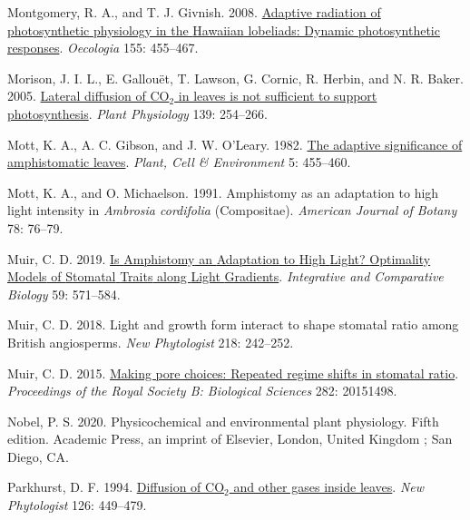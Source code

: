 \documentclass[
  letterpaper,
  DIV=11,
  numbers=noendperiod]{scrartcl}
\newlength{\cslhangindent}
\newlength{\cslentryspacingunit} %
\newenvironment{CSLReferences}[2] %
 {%
  \setlength{\parindent}{0pt}
  \ifodd #1
  \let\oldpar\par
  \def\par{\hangindent=\cslhangindent\oldpar}
  \fi
  \setlength{\parskip}{#2\cslentryspacingunit}
 }%
 {}
\begin{document}
\begin{CSLReferences}{1}{0}
\leavevmode{}%
Montgomery, R. A., and T. J. Givnish. 2008.
\href{https://doi.org/10.1007/s00442-007-0936-3}{Adaptive radiation of
photosynthetic physiology in the {Hawaiian} lobeliads: Dynamic
photosynthetic responses}. \emph{Oecologia} 155: 455--467.

\leavevmode{}%
Morison, J. I. L., E. Gallouët, T. Lawson, G. Cornic, R. Herbin, and N.
R. Baker. 2005. \href{https://doi.org/10.1104/pp.105.062950}{Lateral
diffusion of {CO}\(_{\textrm{2}}\) in leaves is not sufficient to
support photosynthesis}. \emph{Plant Physiology} 139: 254--266.

\leavevmode{}%
Mott, K. A., A. C. Gibson, and J. W. O'Leary. 1982.
\href{https://doi.org/10.1111/1365-3040.ep11611750}{The adaptive
significance of amphistomatic leaves}. \emph{Plant, Cell \& Environment}
5: 455--460.

\leavevmode{}%
Mott, K. A., and O. Michaelson. 1991. Amphistomy as an adaptation to
high light intensity in \emph{{Ambrosia} cordifolia} ({Compositae}).
\emph{American Journal of Botany} 78: 76--79.

\leavevmode{}%
Muir, C. D. 2019. \href{https://doi.org/10.1093/icb/icz085}{Is
{Amphistomy} an {Adaptation} to {High} {Light}? {Optimality} {Models} of
{Stomatal} {Traits} along {Light} {Gradients}}. \emph{Integrative and
Comparative Biology} 59: 571--584.

\leavevmode{}%
Muir, C. D. 2018. Light and growth form interact to shape stomatal ratio
among {British} angiosperms. \emph{New Phytologist} 218: 242--252.

\leavevmode{}%
Muir, C. D. 2015. \href{https://doi.org/10.1098/rspb.2015.1498}{Making
pore choices: Repeated regime shifts in stomatal ratio}.
\emph{Proceedings of the Royal Society B: Biological Sciences} 282:
20151498.

\leavevmode{}%
Nobel, P. S. 2020. Physicochemical and environmental plant physiology.
Fifth edition. Academic Press, an imprint of Elsevier, London, United
Kingdom ; San Diego, CA.

\leavevmode{}%
Parkhurst, D. F. 1994.
\href{http://www.jstor.org/stable/2557929}{Diffusion of
{CO}\(_{\textrm{2}}\) and other gases inside leaves}. \emph{New
Phytologist} 126: 449--479.


\end{CSLReferences}
\end{document}
